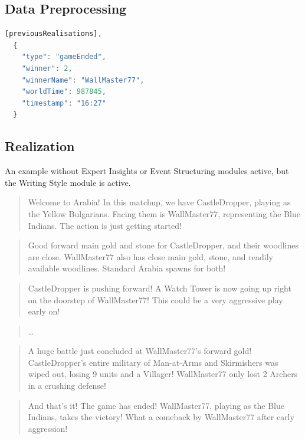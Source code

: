 \subsection{Data Preprocessing}
\label{sec:example-preprocessing}
\begin{lstlisting}[language=JavaScript, caption={Document Preprocessing output: Including readable timestamps and full text player names.}, label={lst:preprocessing-output}]
  [previousRealisations],
  {
    "type": "gameEnded",
    "winner": 2,
    "winnerName": "WallMaster77",
    "worldTime": 987845,
    "timestamp": "16:27"
  }
\end{lstlisting}
\subsection{Realization}
\label{sec:example-realization}
An example without Expert Insights or Event Structuring modules active, but the Writing Style module is active.
\begin{quote}
  Welcome to Arabia! In this matchup, we have CastleDropper, playing as the Yellow Bulgarians. Facing them is WallMaster77, representing the Blue Indians. The action is just getting started!
\end{quote}

\begin{quote}
  Good forward main gold and stone for CastleDropper, and their woodlines are close. WallMaster77 also has close main gold, stone, and readily available woodlines. Standard Arabia spawns for both!
\end{quote}

\begin{quote}
  CastleDropper is pushing forward! A Watch Tower is now going up right on the doorstep of WallMaster77! This could be a very aggressive play early on!
\end{quote}

\begin{quote}
  \dots
\end{quote}

\begin{quote}
  A huge battle just concluded at WallMaster77's forward gold! CastleDropper's entire military of Man-at-Arms and Skirmishers was wiped out, losing 9 units and a Villager! WallMaster77 only lost 2 Archers in a crushing defense!
\end{quote}

\begin{quote}
  And that's it! The game has ended! WallMaster77, playing as the Blue Indians, takes the victory! What a comeback by WallMaster77 after early aggression!
\end{quote}


